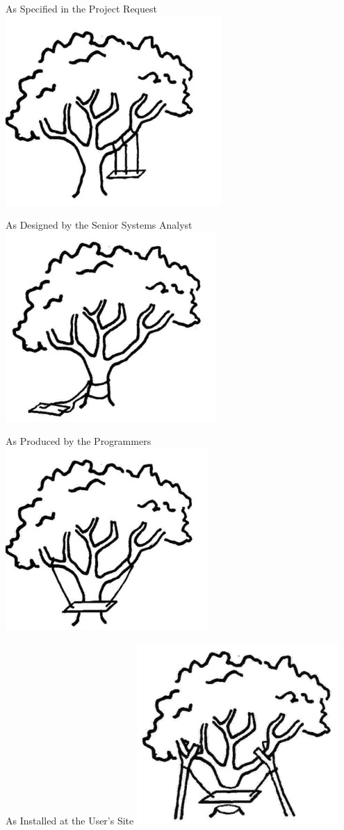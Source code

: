 \documentclass{beamer}
\begin{document}
\begin{frame}[t]{As Specified in the Project Request}
    \includegraphics[width=.4\textwidth]{treemana.jpg} 
\end{frame}
\begin{frame}[t]{As Designed by the Senior Systems Analyst}
    \includegraphics[width=.4\textwidth]{treeeng.jpg} 
\end{frame}
\begin{frame}[t]{As Produced by the Programmers}
    \includegraphics[width=.4\textwidth]{treemanu.jpg} 
\end{frame}
\begin{frame}[t]{As Installed at the User's Site}
    \includegraphics[width=.4\textwidth]{treemain.jpg} 
\end{frame}
\end{document}
